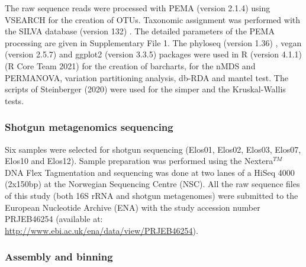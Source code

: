    The raw sequence reads were processed with PEMA (version 2.1.4) \citep{zafeiropoulos2020pema} using VSEARCH for the creation of OTUs. 
   Taxonomic assignment was performed with the SILVA database (version 132) \citep{quast_silva_2013}. 
   The detailed parameters of the PEMA processing are given in Supplementary File 1. 
   The phyloseq (version 1.36) \citep{mcmurdie2013phyloseq}, vegan (version  2.5.7) \citep{oksanen_vegan_2020} and ggplot2 (version 3.3.5) \citep{wickham2016package} packages were used in R (version 4.1.1) (R Core Team 2021) for the creation of barcharts, for the nMDS and PERMANOVA, variation partitioning analysis, db-RDA and mantel test. 
   The scripts of Steinberger (2020) \citep{steinberger_asteinberger9seq_scripts_2020} were used for the simper and the Kruskal-Wallis tests. 


\subsubsection*{Shotgun metagenomics sequencing}

   Six samples were selected for shotgun sequencing (Elos01, Elos02, Elos03, Elos07, Elos10 and Elos12). 
   Sample preparation was performed using the Nextera$^{TM}$ DNA Flex Tagmentation and sequencing was done at two lanes of a HiSeq 4000 (2x150bp) at the Norwegian Sequencing Centre (NSC). 
   All the raw sequence files of this study (both 16S rRNA and shotgun metagenomes) were submitted to the European Nucleotide Archive (ENA) \citep{cummins_european_2022} with the study accession number PRJEB46254 
   (available at: \\ \href{http://www.ebi.ac.uk/ena/data/view/PRJEB46254}{http://www.ebi.ac.uk/ena/data/view/PRJEB46254}).


\subsubsection*{Assembly and binning}

